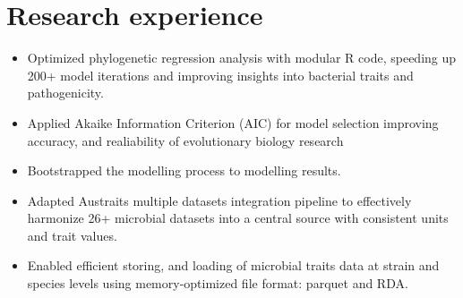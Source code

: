 \documentclass[12pt,a4paper,sans]{moderncv} %
\begin{document}
\section{Research experience}

{
}
{
    \begin{itemize} 
        \item Optimized phylogenetic regression analysis with modular R code, speeding up 200+ model iterations and improving insights into bacterial traits and pathogenicity.
        \item Applied Akaike Information Criterion (AIC) for model selection improving accuracy, and realiability of evolutionary biology research
        \item Bootstrapped the modelling process to modelling results.
    \end{itemize}
}
{
    \begin{itemize} 
            \item Adapted Austraits multiple datasets integration pipeline to effectively harmonize 26+ microbial datasets into a central source with consistent units and trait values. 
            \item Enabled efficient storing, and loading of microbial traits data at strain and species levels using memory-optimized file format: parquet and RDA.
    \end{itemize}
}
\end{document}
